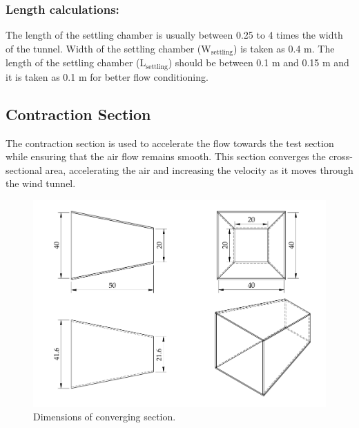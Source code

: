 
\subsubsection{Length calculations:}

The length of the settling chamber is usually between 0.25 to 4 times the width of the tunnel.  Width of the settling chamber (W$_{\text{settling}}$) is taken as 0.4 m. The length of the settling chamber (L$_{\text{settling}}$) should be between 0.1 m and 0.15 m and it is taken as 0.1 m  for better flow conditioning.


\subsection{Contraction Section}
The contraction section is used to accelerate the flow towards the test section while ensuring that the air flow remains smooth. This section converges the cross-sectional area, accelerating the air and increasing the velocity as it moves through the wind tunnel.
\begin{figure}[H]
    \centering
    \includegraphics[width=\linewidth]{gfx/Convergent_section_wind_tunnel.pdf}
    \caption{Dimensions of converging section.}
    \label{fig:converge section}
\end{figure}

